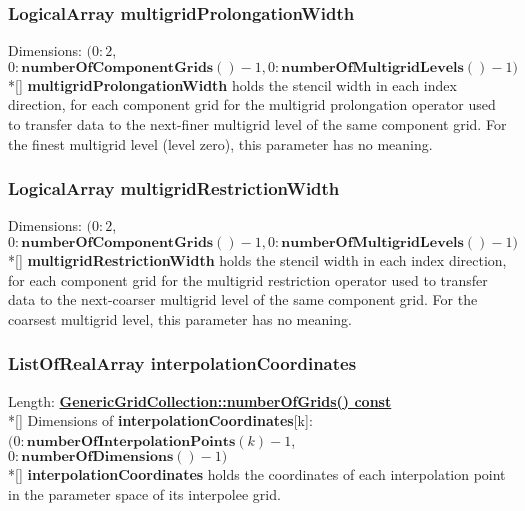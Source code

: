 \documentclass{article}
\begin{document}
  \subsubsection{LogicalArray multigridProlongationWidth}
  \label{CompositeGrid::multigridProlongationWidth}
    Dimensions: $(0\colon2$, $0\colon\textbf{numberOfComponentGrids}()-1,0\colon\textbf{numberOfMultigridLevels}()-1)$ \\*[\parskip]
    \textbf{multigridProlongationWidth} holds the stencil width in each index direction, for each component grid for the multigrid
    prolongation operator used to transfer data to the next-finer multigrid level of the same component grid.
    For the finest multigrid level (level zero), this parameter has no meaning.

  \subsubsection{LogicalArray multigridRestrictionWidth}
  \label{CompositeGrid::multigridRestrictionWidth}
    Dimensions: $(0\colon2$, $0\colon\textbf{numberOfComponentGrids}()-1,0\colon\textbf{numberOfMultigridLevels}()-1)$ \\*[\parskip]
    \textbf{multigridRestrictionWidth} holds the stencil width in each index direction, for each component grid for the multigrid
    restriction operator used to transfer data to the next-coarser multigrid level of the same component grid.
    For the coarsest multigrid level, this parameter has no meaning.

  \subsubsection{ListOfRealArray interpolationCoordinates}
  \label{CompositeGrid::interpolationCoordinates}
    Length: {\bf{}\hyperref{numberOfGrids()}{numberOfGrids() \rm(\S}{)}{GenericGridCollection::numberOfGrids() const}} \\*[\parskip]
    Dimensions of \textbf{interpolationCoordinates}[k]:
    $(0\colon\textbf{numberOfInterpolationPoints}(k)-1$, $0\colon\textbf{numberOfDimensions}()-1)$ \\*[\parskip]
    \textbf{interpolationCoordinates} holds the coordinates of each interpolation point in the parameter space of its interpolee grid.
\end{document}
